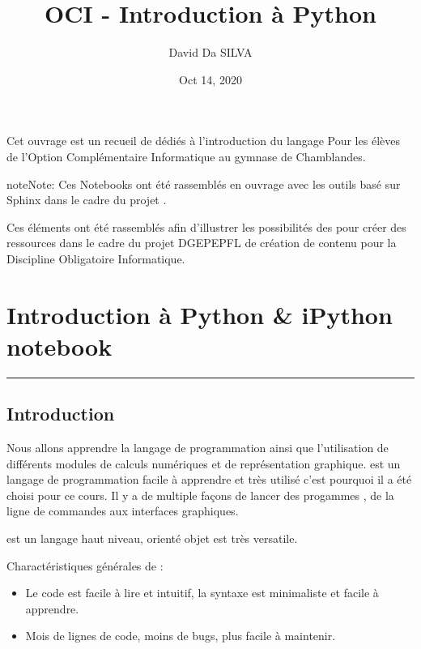 \documentclass[letterpaper,10pt,english]{sphinxmanual}
\title{OCI - Introduction à Python}
\date{Oct 14, 2020}
\author{David Da SILVA}
\begin{document}
\pagestyle{empty}
\sphinxmaketitle
\pagestyle{plain}
\sphinxtableofcontents
\pagestyle{normal}
\label{\detokenize{src/index::doc}}


Cet ouvrage est un recueil de 
dédiés à l’introduction du langage 
Pour les élèves de l’Option Complémentaire Informatique au gymnase de Chamblandes.

\begin{sphinxadmonition}{note}{Note:}
Ces Notebooks ont été rassemblés en ouvrage avec les outils
 basé sur Sphinx
dans le cadre du projet .
\end{sphinxadmonition}

Ces éléments ont été rassemblés afin d’illustrer les possibilités des
 pour créer des ressources
dans le cadre du projet DGEP\sphinxhyphen{}EPFL de création de contenu pour la Discipline Obligatoire Informatique.


\chapter{Introduction à Python \& iPython notebook}
\label{\detokenize{src/OCI01_Introduction:introduction-a-python-ipython-notebook}}\label{\detokenize{src/OCI01_Introduction::doc}}

\bigskip\hrule\bigskip



\section{Introduction}
\label{\detokenize{src/OCI01_Introduction:introduction}}
Nous allons apprendre la langage de programmation  ainsi que l’utilisation de différents modules de calculs numériques et de représentation graphique.  est un langage de programmation facile à apprendre et très utilisé c’est pourquoi il a été choisi pour ce cours. Il y a de multiple façons de lancer des progammes , de la ligne de commandes aux interfaces graphiques.

 est un langage haut niveau, orienté objet est très versatile.

Charactéristiques générales de :
\begin{itemize}
\item {} 
 Le code est facile à lire et intuitif, la syntaxe est minimaliste et facile à apprendre.

\item {} 
 Mois de lignes de code, moins de bugs, plus facile à maintenir.

\end{itemize}
\end{document}
